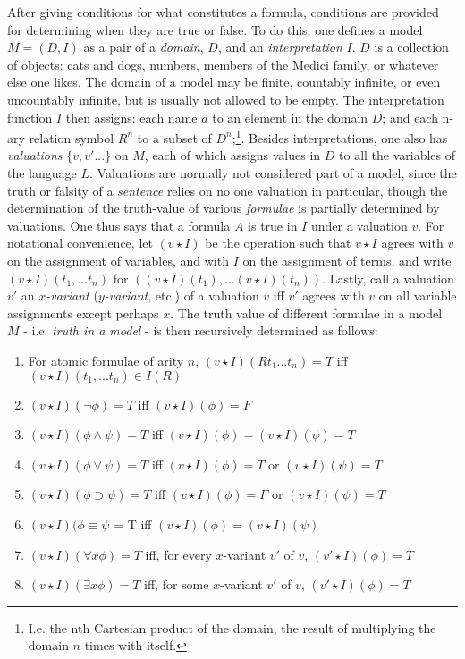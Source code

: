 \documentclass[]{article}
\begin{document}
After giving conditions for what constitutes a formula, conditions are provided for determining when they are true or false. To do this, one defines a model $M = (D, I)$ as a pair of a \textit{domain}, $D$, and an \textit{interpretation} $I$. $D$ is  a collection of objects: cats and dogs, numbers, members of the Medici family, or whatever else one likes. The domain of a model may be finite, countably infinite, or even uncountably infinite, but is usually not allowed to be empty. The interpretation function $I$ then assigns: each name $a$ to an element in the domain $D$; and each n-ary relation symbol $R^{n}$ to a subset of $D^{n}$;\footnote{I.e. the nth Cartesian product of the domain, the result of multiplying the domain $n$ times with itself.}. Besides interpretations, one also has \textit{valuations} $\{v, v' ...\}$ on $M$, each of which assigns values in $D$ to all the variables of the language $L$. Valuations are normally not considered part of a model, since the truth or falsity of a \textit{sentence} relies on no one valuation in particular, though the determination of the truth-value of various \textit{formulae} is partially determined by valuations. One thus says that a formula $A$ is true in $I$ under a valuation $v$. For notational convenience, let $(v \star I)$ be the operation such that $v \star I$ agrees with $v$ on the assignment of variables, and with $I$ on the assignment of terms, and write $(v \star I)(t_{1}, ...t_{n})$ for $((v \star I)(t_{1}), ... (v \star I)(t_{n}))$. Lastly, call a valuation $v'$ an \textit{$x$-variant} (\textit{$y$-variant}, etc.) of a valuation $v$ iff $v'$ agrees with $v$ on all variable assignments except perhaps $x$. The truth value of different formulae in a model $M$ - i.e. \textit{truth in a model} - is then recursively determined as follows:

\begin{enumerate}
\item For atomic formulae of arity $n$, $(v \star I)(Rt_{1}...t_{n}) = T$ iff $(v \star I)(t_{1}, ... t_{n}) \in I(R)$
\item $(v \star I)(\neg\phi) = T$ iff $(v \star I)(\phi) = F$
\item $(v \star I)(\phi \wedge \psi) = T$ iff $(v \star I)(\phi) = (v \star I)(\psi) = T$
\item $(v \star I)(\phi \vee \psi) = T$ iff $(v \star I)(\phi) = T$ or $(v \star I)(\psi) = T$
\item $(v \star I)(\phi \supset \psi) = T$ iff $(v \star I)(\phi) = F$ or $(v \star I)(\psi) = T$
\item $(v \star I)(\phi \equiv \psi$ = T iff $(v \star I)(\phi) = (v \star I)(\psi)$
\item $(v \star I)(\forall x \phi) = T$ iff, for every $x$-variant $v'$ of $v$, $(v' \star I)(\phi) = T$
\item $(v \star I)(\exists x \phi) = T$ iff, for some $x$-variant $v'$ of $v$, $(v' \star I)(\phi) = T$
\end{enumerate}
\end{document}
